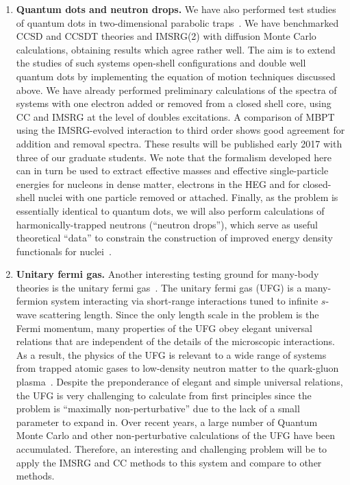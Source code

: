 \begin{enumerate}
\item{\bf Quantum dots and neutron drops.} We have also performed
 test studies of quantum dots in two-dimensional parabolic
  traps~\cite{Lohne:2010aw,sarahthesis}.  We have benchmarked CCSD and CCSDT theories and IMSRG(2) with
  diffusion Monte Carlo calculations, obtaining results which agree
  rather well. The aim is to extend the studies of such systems
  open-shell configurations and double well quantum dots by implementing the equation of motion techniques discussed above. 
  We have already performed preliminary calculations of the spectra of systems with one electron added or removed from a closed shell core, using CC and IMSRG at the level of doubles excitations. A comparison of MBPT using the IMSRG-evolved interaction to third order shows good agreement for addition and removal spectra. These results will be published early 2017 with three of our graduate students. We note that the formalism developed here can in turn be used to extract effective masses and effective single-particle energies for nucleons in dense matter, electrons in the HEG and for closed-shell nuclei with one particle removed or attached.
 Finally, as the problem is essentially identical to quantum dots, we will
  also perform calculations of harmonically-trapped neutrons
  (``neutron drops''), which serve as useful theoretical ``data'' to
  constrain the construction of improved energy density functionals  for
  nuclei~\cite{Bogner:2011kp}.

\item{\bf Unitary fermi gas.}  Another interesting testing ground for
  many-body theories is the unitary fermi gas~\cite{UFG}. The unitary
  fermi gas (UFG) is a many-fermion system interacting via short-range
  interactions tuned to infinite $s$-wave scattering length. Since the
  only length scale in the problem is the Fermi momentum, many
  properties of the UFG obey elegant universal relations that are
  independent of the details of the microscopic interactions. As a
  result, the physics of the UFG is relevant to a wide range of
  systems from trapped atomic gases to low-density neutron matter to
  the quark-gluon plasma~\cite{UFG}.  Despite the preponderance of
  elegant and simple universal relations, the UFG is very challenging
  to calculate from first principles since the problem is ``maximally
  non-perturbative'' due to the lack of a small parameter to expand
  in.  Over recent years, a large number of Quantum Monte Carlo and other
  non-perturbative calculations of the UFG have been
  accumulated. Therefore, an interesting and challenging problem will
  be to apply the IMSRG and CC methods to this system and
  compare to other methods.

\end{enumerate}



